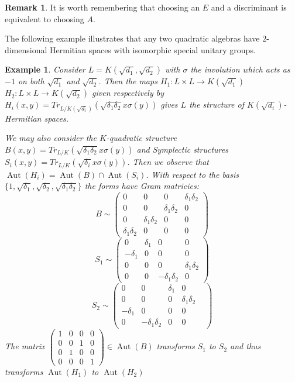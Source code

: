 \documentclass{article}
\theoremstyle{plain}
\newtheorem{example}[theorem]{Example}
\theoremstyle{definition}
\newtheorem{remark}[theorem]{Remark}
\DeclareMathOperator{\Aut}{Aut}
\begin{document}
\begin{itemize}
\begin{remark}
It is worth remembering that choosing an $E$ and a discriminant is equivalent to choosing $A$.

The following example illustrates that any two quadratic algebras have $2$-dimensional Hermitian spaces with isomorphic special unitary groups.
\begin{example}
Consider $L = K(\sqrt{d_1},\sqrt{d_2})$ with $\sigma$ the involution which acts as $-1$ on both $\sqrt{d_1}$ and $\sqrt{d_2}$.
Then the maps $H_1 : L \times L \rightarrow K(\sqrt{d_1})$  $H_2 : L \times L \rightarrow K(\sqrt{d_2})$ given respectively by 
$H_i(x,y) =  Tr_{L/K(\sqrt{d_i})}(\sqrt{\delta_1\delta_2}x\sigma(y))$ gives $L$ the structure of $K(\sqrt{d_i})$-Hermitian spaces.

We may also consider the $K$-quadratic structure $B(x,y) = Tr_{L/K}(\sqrt{\delta_1\delta_2}x\sigma(y))$ and Symplectic structures $S_i(x,y) = Tr_{L/K}(\sqrt{\delta_i}x\sigma(y))$.
Then we observe that $\Aut(H_i) = \Aut(B) \cap \Aut(S_i)$. With respect to the basis $\{1,\sqrt{\delta_1},\sqrt{\delta_2},\sqrt{\delta_1\delta_2}\}$ the forms have Gram matricies:
\[ B \sim \begin{pmatrix} 0 & 0 & 0 & \delta_1\delta_2 \\ 0 & 0 &  \delta_1\delta_2 & 0 \\ 0 &  \delta_1\delta_2 & 0 & 0 \\  \delta_1\delta_2 & 0 & 0 & 0 \end{pmatrix} \]
\[ S_1 \sim \begin{pmatrix} 0 & \delta_1 & 0 & 0 \\ -\delta_1 & 0 & 0 & 0 \\ 0 & 0 & 0 & \delta_1\delta_2 \\   0 & 0 & -\delta_1\delta_2 & 0  \end{pmatrix} \]
\[ S_2  \sim \begin{pmatrix} 0 & 0 &  \delta_1&0 \\ 0 & 0 & 0 & \delta_1\delta_2 &  \\  -\delta_1 & 0  & 0 & 0 \\   0 & -\delta_1\delta_2 &0 & 0  \end{pmatrix} \]
The matrix $\begin{pmatrix} 1 & 0 & 0 & 0 \\ 0 & 0 & 1 & 0 \\ 0 & 1 & 0 & 0 \\  0 & 0 & 0 & 1 \end{pmatrix} \in \Aut(B)$ transforms $S_1$ to $S_2$ and thus transforms $\Aut(H_1)$ to $\Aut(H_2)$
\end{example}
\end{remark}






\end{itemize}
\end{document}
